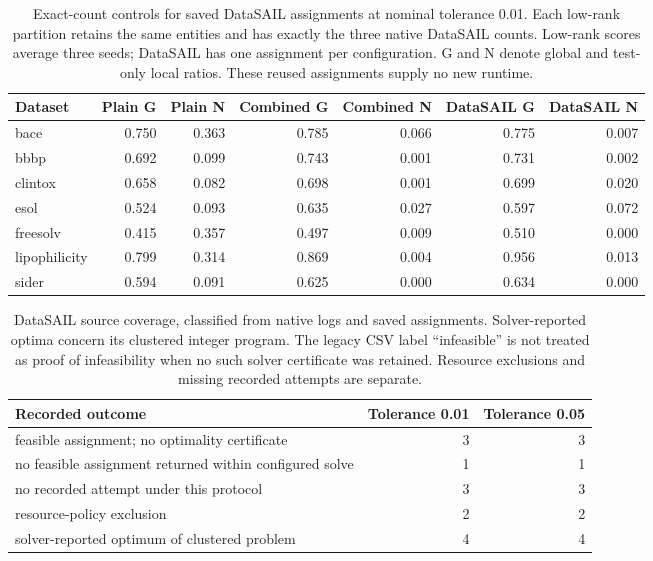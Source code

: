 \begin{table}[htbp]\centering\small
\begin{tabular}{lrrrrrr}
\toprule
Dataset & Plain G & Plain N & Combined G & Combined N & DataSAIL G & DataSAIL N \\
\midrule
bace & 0.750 & 0.363 & 0.785 & 0.066 & 0.775 & 0.007 \\
bbbp & 0.692 & 0.099 & 0.743 & 0.001 & 0.731 & 0.002 \\
clintox & 0.658 & 0.082 & 0.698 & 0.001 & 0.699 & 0.020 \\
esol & 0.524 & 0.093 & 0.635 & 0.027 & 0.597 & 0.072 \\
freesolv & 0.415 & 0.357 & 0.497 & 0.009 & 0.510 & 0.000 \\
lipophilicity & 0.799 & 0.314 & 0.869 & 0.004 & 0.956 & 0.013 \\
sider & 0.594 & 0.091 & 0.625 & 0.000 & 0.634 & 0.000 \\
\bottomrule
\end{tabular}

\caption{Exact-count controls for saved DataSAIL assignments at nominal tolerance 0.01. Each low-rank partition retains the same entities and has exactly the three native DataSAIL counts. Low-rank scores average three seeds; DataSAIL has one assignment per configuration. G and N denote global and test-only local ratios. These reused assignments supply no new runtime.}\end{table}
\begin{table}[htbp]\centering\small
\begin{tabular}{p{4in}rr}
\toprule
Recorded outcome & Tolerance 0.01 & Tolerance 0.05 \\
\midrule
feasible assignment; no optimality certificate & 3 & 3 \\
no feasible assignment returned within configured solve & 1 & 1 \\
no recorded attempt under this protocol & 3 & 3 \\
resource-policy exclusion & 2 & 2 \\
solver-reported optimum of clustered problem & 4 & 4 \\
\bottomrule
\end{tabular}

\caption{DataSAIL source coverage, classified from native logs and saved assignments. Solver-reported optima concern its clustered integer program. The legacy CSV label ``infeasible'' is not treated as proof of infeasibility when no such solver certificate was retained. Resource exclusions and missing recorded attempts are separate.}\end{table}

